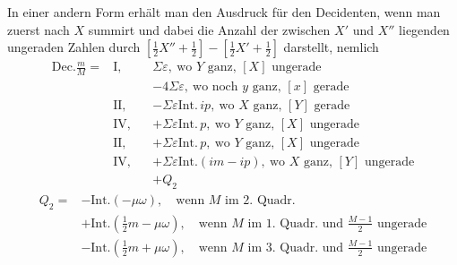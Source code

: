 In einer andern Form erhält man den Ausdruck für den Decidenten, wenn man zuerst nach $X$ summirt und dabei die Anzahl der zwischen $X'$ und $X''$ liegenden ungeraden Zahlen durch $[\tfrac12X''+\tfrac12]-[\tfrac12X'+\tfrac12]$ darstellt, nemlich
\[
\begin{aligned}
\mathrm{Dec.}\frac mM={}&\mathrm{I},& &\Sigma\varepsilon,\ \text{wo }Y\text{ ganz, }[X]\text{ ungerade}\\
&&&-4\Sigma\varepsilon,\ \text{wo noch }y\text{ ganz, }[x]\text{ gerade}\\
&\mathrm{II},&&-\Sigma\varepsilon\mathrm{Int.}\,ip,\ \text{wo }X\text{ ganz, }[Y]\text{ gerade}\\
&\mathrm{IV},&&+\Sigma\varepsilon\mathrm{Int.}\,p,\ \text{wo }Y\text{ ganz, }[X]\text{ ungerade}\\
&\mathrm{II},&&+\Sigma\varepsilon\mathrm{Int.}\,p,\ \text{wo }Y\text{ ganz, }[X]\text{ ungerade}\\
&\mathrm{IV},&&+\Sigma\varepsilon\mathrm{Int.}(im-ip),\ \text{wo }X\text{ ganz, }[Y]\text{ ungerade}\\
&&&+Q_2
\end{aligned}
\]
\[
\begin{aligned}
Q_2={}&-\mathrm{Int.}(-\mu\omega),\quad\text{wenn }M\text{ im }2.\text{ Quadr.}\\
&+\mathrm{Int.}(\tfrac12m-\mu\omega),\quad\text{wenn }M\text{ im }1.\text{ Quadr. und }\frac{M-1}{2}\text{ ungerade}\\
&-\mathrm{Int.}(\tfrac12m+\mu\omega),\quad\text{wenn }M\text{ im }3.\text{ Quadr. und }\frac{M-1}{2}\text{ ungerade}
\end{aligned}
\]

